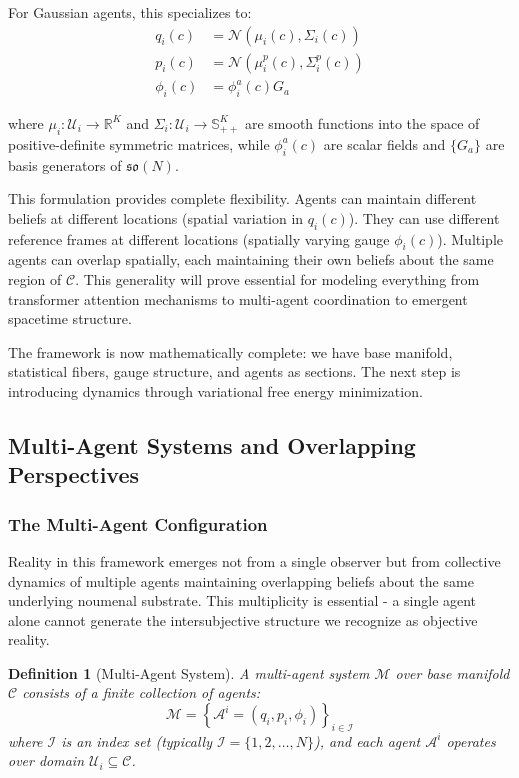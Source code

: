 \documentclass[11pt]{article}
\newtheorem{definition}{Definition}
\begin{document}
For Gaussian agents, this specializes to:
\begin{align}
q_i(c) &= \mathcal{N}(\mu_i(c), \Sigma_i(c)) \\
p_i(c) &= \mathcal{N}(\mu_i^p(c), \Sigma_i^p(c)) \\
\phi_i(c) &= \phi_i^a(c) G_a
\end{align}

where $\mu_i: \mathcal{U}_i \to \mathbb{R}^K$ and $\Sigma_i: \mathcal{U}_i \to \mathbb{S}^K_{++}$ are smooth functions into the space of positive-definite symmetric matrices, while $\phi_i^a(c)$ are scalar fields and $\{G_a\}$ are basis generators of $\mathfrak{so}(N)$.

This formulation provides complete flexibility. Agents can maintain different beliefs at different locations (spatial variation in $q_i(c)$). They can use different reference frames at different locations (spatially varying gauge $\phi_i(c)$). Multiple agents can overlap spatially, each maintaining their own beliefs about the same region of $\mathcal{C}$. This generality will prove essential for modeling everything from transformer attention mechanisms to multi-agent coordination to emergent spacetime structure.

The framework is now mathematically complete: we have base manifold, statistical fibers, gauge structure, and agents as sections. The next step is introducing dynamics through variational free energy minimization.

\subsection{Multi-Agent Systems and Overlapping Perspectives}

\subsubsection{The Multi-Agent Configuration}

Reality in this framework emerges not from a single observer but from collective dynamics of multiple agents maintaining overlapping beliefs about the same underlying noumenal substrate. This multiplicity is essential - a single agent alone cannot generate the intersubjective structure we recognize as objective reality.

\begin{definition}[Multi-Agent System]
A multi-agent system $\mathcal{M}$ over base manifold $\mathcal{C}$ consists of a finite collection of agents:
\begin{equation}
\mathcal{M} = \left\{\mathcal{A}^i = (q_i, p_i, \phi_i)\right\}_{i \in \mathcal{I}}
\end{equation}
where $\mathcal{I}$ is an index set (typically $\mathcal{I} = \{1, 2, \ldots, N\}$), and each agent $\mathcal{A}^i$ operates over domain $\mathcal{U}_i \subseteq \mathcal{C}$.
\end{definition}
\end{document}
